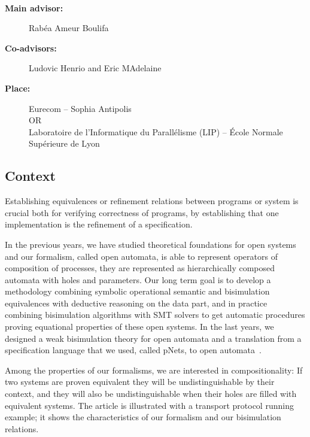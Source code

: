 \documentclass[11pt,fleqn]{article}
\begin{document}
\begin{center}
\\\bigskip
{}
\end{center}
\medskip

\begin{description}
\item[\bf Main advisor:] Rabéa Ameur Boulifa 
\item[\bf Co-advisors:] Ludovic Henrio and Eric MAdelaine
\item[\bf Place:] Eurecom  -- Sophia Antipolis
\\
OR\\
Laboratoire de l'Informatique du Parallélisme (LIP) --
  \'Ecole Normale Supérieure de Lyon
\end{description}

\subsection*{Context}


Establishing equivalences or refinement relations between programs or system is crucial both for verifying correctness of programs, by establishing that one implementation is the refinement of a specification. 

In the previous years, we have studied theoretical foundations for open
systems and our formalism, called open automata, is able to represent operators of composition of processes, 
they are represented
as hierarchically composed automata with holes and parameters. 
Our long 
term goal is to 
develop a methodology combining symbolic operational semantic and bisimulation 
equivalences with deductive reasoning on the data part, 
and in practice combining bisimulation algorithms with SMT solvers to get automatic 
procedures proving equational properties
of these open systems. In the last years, we designed a weak bisimulation theory for  open automata and a translation from a specification language that we used, called pNets, to open automata~\cite{arxiv-weakbisim}.


Among the properties of our formalisms, we are interested in compositionality: If two systems are proven equivalent they will be undistinguishable by their context, and they will also be undistinguishable when their holes are filled with equivalent systems.
The article is illustrated with a transport protocol running example; it shows the characteristics of our formalism and our bisimulation relations.
\end{document}

